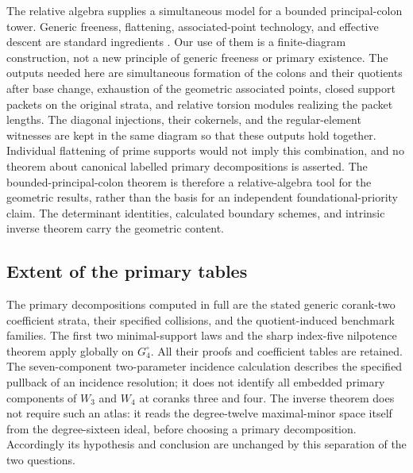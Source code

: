 The relative algebra supplies a simultaneous model for a bounded
principal-colon tower.  Generic freeness, flattening, associated-point
technology, and effective descent are standard ingredients
\cite{StacksGenericFree,StacksFlattening,StacksRelativeAssassin,StacksDescent}.
Our use of them is a finite-diagram construction, not a new principle
of generic freeness or primary existence.  The outputs needed here
are simultaneous formation of the colons and their quotients after
base change, exhaustion of the geometric associated points, closed
support packets on the original strata, and relative torsion modules
realizing the packet lengths.  The diagonal injections, their
cokernels, and the regular-element witnesses are kept in the same
diagram so that these outputs hold together.  Individual flattening
of prime supports would not imply this combination, and no theorem
about canonical labelled primary decompositions is asserted.
The bounded-principal-colon theorem is therefore a relative-algebra
tool for the geometric results, rather than the basis for an independent
foundational-priority claim.  The determinant identities, calculated
boundary schemes, and intrinsic inverse theorem carry the geometric
content.

\subsection{Extent of the primary tables}
\label{sec:primary-table-scope}

The primary decompositions computed in full are the stated generic
corank-two coefficient strata, their specified collisions, and the
quotient-induced benchmark families.  The first two minimal-support
laws and the sharp index-five nilpotence theorem apply globally on
\(G_4^\circ\).  All their proofs and coefficient tables are retained.
The seven-component two-parameter incidence calculation describes the
specified pullback of an incidence resolution; it does not identify
all embedded primary components of \(W_3\) and \(W_4\) at coranks
three and four.  The inverse theorem does not require such an atlas:
it reads the degree-twelve maximal-minor space itself from the
degree-sixteen ideal, before choosing a primary decomposition.
Accordingly its hypothesis and conclusion are unchanged by this
separation of the two questions.
